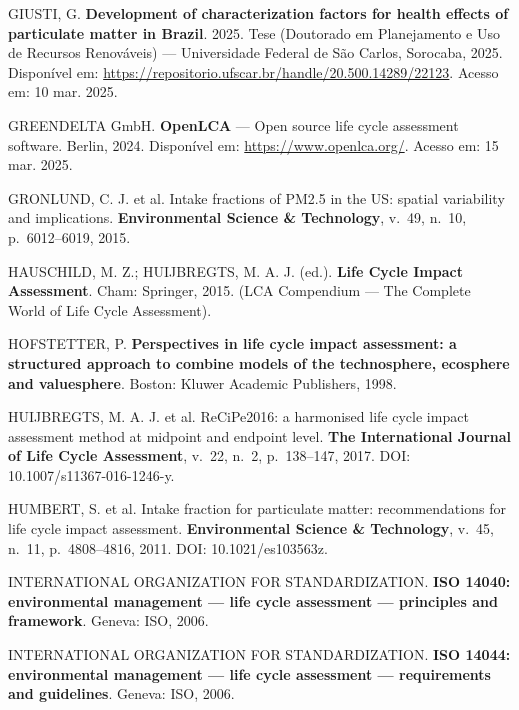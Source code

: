 \begin{description}[style=nextline, leftmargin=0pt, labelindent=0pt]
\item[GIUSTI, 2025.] GIUSTI, G. \textbf{Development of characterization factors for health effects of particulate matter in Brazil}. 2025. Tese (Doutorado em Planejamento e Uso de Recursos Renov\'aveis) --- Universidade Federal de S\~ao Carlos, Sorocaba, 2025. Dispon\'ivel em: \url{https://repositorio.ufscar.br/handle/20.500.14289/22123}. Acesso em: 10 mar. 2025.

\item[GREENDELTA, 2024.] GREENDELTA GmbH. \textbf{OpenLCA} --- Open source life cycle assessment software. Berlin, 2024. Dispon\'ivel em: \url{https://www.openlca.org/}. Acesso em: 15 mar. 2025.

\item[GRONLUND et al., 2015.] GRONLUND, C. J. et al. Intake fractions of PM2.5 in the US: spatial variability and implications. \textbf{Environmental Science \& Technology}, v.~49, n.~10, p.~6012--6019, 2015.

\item[HAUSCHILD; HUIJBREGTS, 2015.] HAUSCHILD, M. Z.; HUIJBREGTS, M. A. J. (ed.). \textbf{Life Cycle Impact Assessment}. Cham: Springer, 2015. (LCA Compendium --- The Complete World of Life Cycle Assessment).

\item[HOFSTETTER, 1998.] HOFSTETTER, P. \textbf{Perspectives in life cycle impact assessment: a structured approach to combine models of the technosphere, ecosphere and valuesphere}. Boston: Kluwer Academic Publishers, 1998.

\item[HUIJBREGTS et al., 2017.] HUIJBREGTS, M. A. J. et al. ReCiPe2016: a harmonised life cycle impact assessment method at midpoint and endpoint level. \textbf{The International Journal of Life Cycle Assessment}, v.~22, n.~2, p.~138--147, 2017. DOI: 10.1007/s11367-016-1246-y.

\item[HUMBERT et al., 2011.] HUMBERT, S. et al. Intake fraction for particulate matter: recommendations for life cycle impact assessment. \textbf{Environmental Science \& Technology}, v.~45, n.~11, p.~4808--4816, 2011. DOI: 10.1021/es103563z.

\item[ISO, 2006a.] INTERNATIONAL ORGANIZATION FOR STANDARDIZATION. \textbf{ISO 14040: environmental management --- life cycle assessment --- principles and framework}. Geneva: ISO, 2006.

\item[ISO, 2006b.] INTERNATIONAL ORGANIZATION FOR STANDARDIZATION. \textbf{ISO 14044: environmental management --- life cycle assessment --- requirements and guidelines}. Geneva: ISO, 2006.


\end{description}
